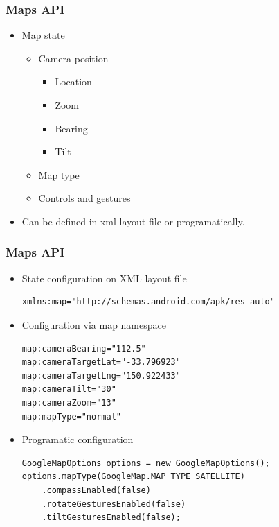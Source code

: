 \documentclass[10pt,xcolor=pdflatex]{beamer}
\begin{document}
\begin{frame}[fragile]\frametitle{Maps API}
\begin{itemize}
	\item Map state
	  \begin{itemize}
		\item Camera position
          \begin{itemize}
            \item Location
	        \item Zoom
	        \item Bearing
	        \item Tilt
          \end{itemize}
    	\item Map type
		\item Controls and gestures
      \end{itemize}
    \item Can be defined in xml layout file or programatically.
\end{itemize}
\end{frame}


\begin{frame}[fragile]\frametitle{Maps API}
\begin{itemize}
	\item State configuration on XML layout file
      \lstset{language=Java, basicstyle=\footnotesize\ttfamily}
      \begin{lstlisting}
xmlns:map="http://schemas.android.com/apk/res-auto"
\end{lstlisting}
    \item Configuration via map namespace
      \lstset{language=Java, basicstyle=\footnotesize\ttfamily}
      \begin{lstlisting}
map:cameraBearing="112.5"
map:cameraTargetLat="-33.796923"
map:cameraTargetLng="150.922433"
map:cameraTilt="30"
map:cameraZoom="13"
map:mapType="normal"
\end{lstlisting}
    \item Programatic configuration
      \lstset{language=Java, basicstyle=\footnotesize\ttfamily}
      \begin{lstlisting}
GoogleMapOptions options = new GoogleMapOptions();
options.mapType(GoogleMap.MAP_TYPE_SATELLITE)
    .compassEnabled(false)
    .rotateGesturesEnabled(false)
    .tiltGesturesEnabled(false);
\end{lstlisting}
\end{itemize}
\end{frame}
\end{document}
